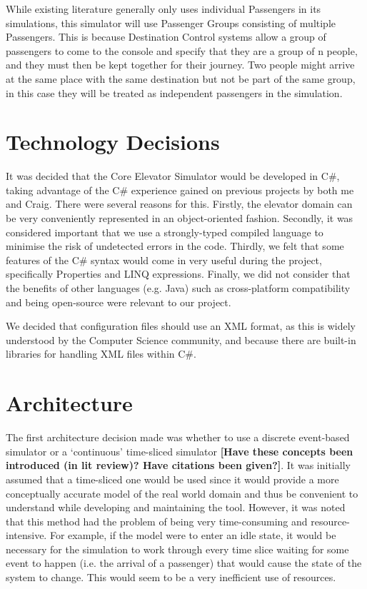 \documentclass{UoYCSproject}
\begin{document}
While existing literature generally only uses individual Passengers in its simulations, this simulator will use Passenger Groups consisting of multiple Passengers.  This is because Destination Control systems allow a group of passengers to come to the console and specify that they are a group of n people, and they must then be kept together for their journey.  Two people might arrive at the same place with the same destination but not be part of the same group, in this case they will be treated as independent passengers in the simulation.

\section{Technology Decisions}

It was decided that the Core Elevator Simulator would be developed in C\#, taking advantage of the C\# experience gained on previous projects by both me and Craig.  There were several reasons for this.  Firstly, the elevator domain can be very conveniently represented in an object-oriented fashion.  Secondly, it was considered important that we use a strongly-typed compiled language to minimise the risk of undetected errors in the code.  Thirdly, we felt that some features of the C\# syntax would come in very useful during the project, specifically Properties and LINQ expressions.  Finally, we did not consider that the benefits of other languages (e.g. Java) such as cross-platform compatibility and being open-source were relevant to our project.

We decided that configuration files should use an XML format, as this is widely understood by the Computer Science community, and because there are built-in libraries for handling XML files within C\#.

\section{Architecture}

The first architecture decision made was whether to use a discrete event-based simulator or a `continuous' time-sliced simulator \textbf{[Have these concepts been introduced (in lit review)? Have citations been given?]}.  It was initially assumed that a time-sliced one would be used since it would provide a more conceptually accurate model of the real world domain and thus be convenient to understand while developing and maintaining the tool.  However, it was noted that this method had the problem of being very time-consuming and resource-intensive.  For example, if the model were to enter an idle state, it would be necessary for the simulation to work through every time slice waiting for some event to happen (i.e. the arrival of a passenger) that would cause the state of the system to change.  This would seem to be a very inefficient use of resources.
\end{document}
